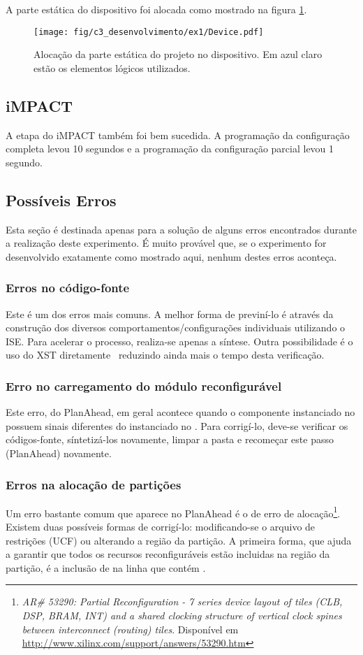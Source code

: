 \documentclass[11pt,a4paper,oneside]{book}
\begin{document}
A parte estática do dispositivo foi alocada como mostrado na figura \ref{fig:ex1:device}.
\begin{figure}[h]
\centering
\texttt{[image: fig/c3\_desenvolvimento/ex1/Device.pdf]}
\caption{Alocação da parte estática do projeto no dispositivo. Em azul claro estão os elementos lógicos utilizados.}
\label{fig:ex1:device}
\end{figure}

\subsection{iMPACT}
A etapa do iMPACT também foi bem sucedida.
A programação da configuração completa levou 10 segundos e a programação da configuração parcial levou 1 segundo.

\subsection{Possíveis Erros}
Esta seção é destinada apenas para a solução de alguns erros encontrados durante a realização deste experimento.
É muito provável que, se o experimento for desenvolvido exatamente como mostrado aqui, nenhum destes erros aconteça.

\subsubsection{Erros no código-fonte} Este é um dos erros mais comuns.
A melhor forma de previní-lo é através da construção dos diversos comportamentos/configurações individuais utilizando o ISE.
Para acelerar o processo, realiza-se apenas a síntese.
Outra possibilidade é o uso do XST diretamente \, reduzindo ainda mais o tempo desta verificação. 

\subsubsection{Erro no carregamento do módulo reconfigurável}
Este erro, do PlanAhead, em geral acontece quando o componente instanciado no  possuem sinais diferentes do instanciado no .
Para corrigí-lo, deve-se verificar os códigos-fonte, síntetizá-los novamente, limpar a pasta  e recomeçar este passo (PlanAhead) novamente.

\subsubsection{Erros na alocação de partições}
\label{par:alocacao}
Um erro bastante comum que aparece no PlanAhead é o de erro de alocação\footnote{\textit{AR\# 53290: Partial Reconfiguration - 7 series device layout of tiles (CLB, DSP, BRAM, INT) and a shared clocking structure of vertical clock spines between interconnect (routing) tiles}. Disponível em \url{http://www.xilinx.com/support/answers/53290.htm}}.
Existem duas possíveis formas de corrigí-lo: modificando-se o arquivo de restrições (UCF) ou alterando a região da partição.
A primeira forma, que ajuda a garantir que todos os recursos reconfiguráveis estão incluidas na região da partição, é a inclusão de  na linha que contém .
\end{document}
